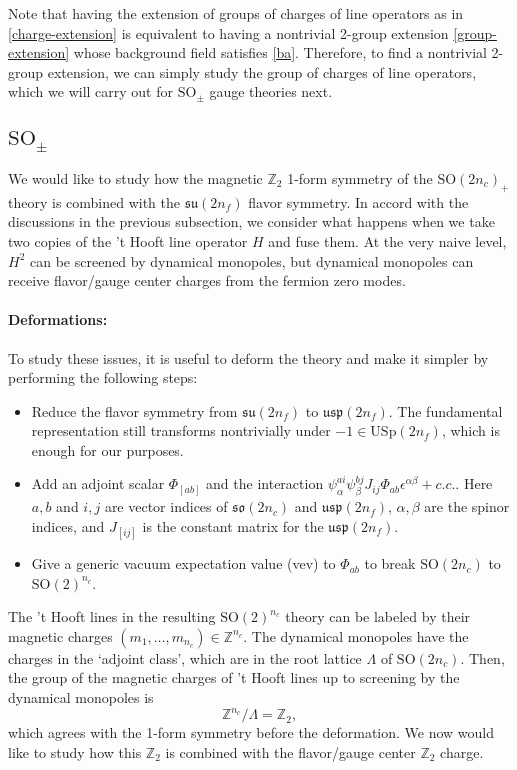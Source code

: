 \documentclass[12pt]{article}
\numberwithin{equation}{section}
\def\bZ{\mathbb{Z}}
\def\SO{\mathrm{SO}}
\def\USp{\mathrm{USp}}
\def\su{\mathfrak{su}}
\def\so{\mathfrak{so}}
\def\usp{\mathfrak{usp}}
\begin{document}
Note that having the extension of groups of charges of line operators as in \eqref{charge-extension}
is equivalent to having a nontrivial 2-group extension \eqref{group-extension} 
whose background field satisfies \eqref{ba}.
Therefore, to find a nontrivial 2-group extension, we can simply study the group of charges of line operators,
which we will carry out for $\SO_\pm$ gauge theories next.

\subsection{$\SO_\pm$}

We would like to study how the magnetic $\bZ_2$ 1-form symmetry of the $\SO(2n_c)_+$ theory is combined with the $\su(2n_f)$ flavor symmetry.
In accord with the discussions in the previous subsection, 
we consider what happens when we take two copies of the 't Hooft line operator $H$ and fuse them.
At the very naive level, $H^2$ can be screened by dynamical monopoles,
but dynamical monopoles can receive flavor/gauge center charges from the fermion zero modes.

\paragraph{Deformations:}
To study these issues, it is useful to deform the theory and make it simpler
by performing the following steps:
\begin{itemize}
\item Reduce the flavor symmetry from $\su(2n_f)$ to $\usp(2n_f)$. 
The fundamental representation still transforms nontrivially under $-1\in \USp(2n_f)$, which is enough for our purposes.
\item Add an adjoint scalar $\Phi_{[ab]}$ and the interaction $\psi^{ai}_\alpha \psi^{bj}_\beta J_{ij} \Phi_{ab}\epsilon^{\alpha\beta} +c.c.$.
Here $a,b$ and $i,j$ are vector indices of $\so(2n_c)$ and $\usp(2n_f)$,
$\alpha,\beta$ are the spinor indices,
and  $J_{[ij]}$ is the constant matrix for the $\usp(2n_f)$.
\item Give a generic vacuum expectation value (vev) to $\Phi_{ab}$ to break $\SO(2n_c)$ to $\SO(2)^{n_c}$.
\end{itemize}

The 't Hooft lines in the resulting $\SO(2)^{n_c}$ theory can be labeled by their magnetic charges $(m_1,\ldots,m_{n_c})\in \bZ^{n_c}$.
The dynamical monopoles have the charges in the `adjoint class', which are
in the root lattice $\Lambda$ of $\SO(2n_c)$. 
Then, the group of the magnetic charges of 't Hooft lines up to screening by the dynamical monopoles is \begin{equation}
\bZ^{n_c}/\Lambda = \bZ_2,
\end{equation}
which agrees with the 1-form symmetry before the deformation.
We now would like to study how this $\bZ_2$ is combined with the flavor/gauge center $\bZ_2$ charge.
\end{document}
